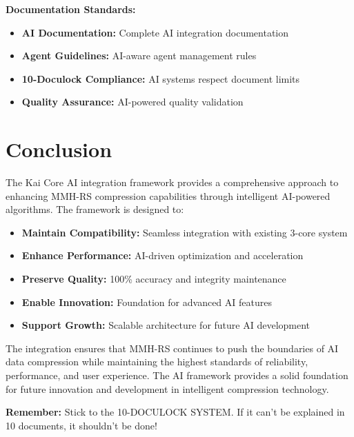 \documentclass[12pt,a4paper]{article}
\begin{document}
\textbf{Documentation Standards:}
\begin{itemize}
    \item \textbf{AI Documentation:} Complete AI integration documentation
    \item \textbf{Agent Guidelines:} AI-aware agent management rules
    \item \textbf{10-Doculock Compliance:} AI systems respect document limits
    \item \textbf{Quality Assurance:} AI-powered quality validation
\end{itemize}

\section{Conclusion}

The Kai Core AI integration framework provides a comprehensive approach to enhancing MMH-RS compression capabilities through intelligent AI-powered algorithms. The framework is designed to:

\begin{itemize}
    \item \textbf{Maintain Compatibility:} Seamless integration with existing 3-core system
    \item \textbf{Enhance Performance:} AI-driven optimization and acceleration
    \item \textbf{Preserve Quality:} 100\% accuracy and integrity maintenance
    \item \textbf{Enable Innovation:} Foundation for advanced AI features
    \item \textbf{Support Growth:} Scalable architecture for future AI development
\end{itemize}

The integration ensures that MMH-RS continues to push the boundaries of AI data compression while maintaining the highest standards of reliability, performance, and user experience. The AI framework provides a solid foundation for future innovation and development in intelligent compression technology.

\textbf{Remember:} Stick to the 10-DOCULOCK SYSTEM. If it can't be explained in 10 documents, it shouldn't be done!
\end{document}
